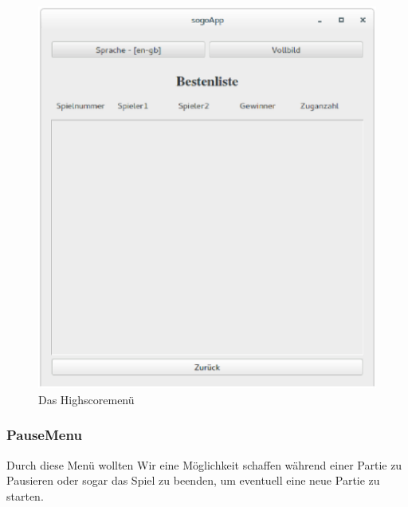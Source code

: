 \documentclass[a4paper]{scrartcl}
\begin{document}
\begin{figure}[H]
 	\centering
 	\includegraphics[scale=0.35]{graphics/highscore.eps}
 	\caption{Das Highscoremenü}
 	\label{fig:Highscoremenü}
\end{figure}

\subsubsection{PauseMenu}\label{ch:PauseMenu}
Durch diese Menü wollten Wir eine Möglichkeit schaffen während einer Partie zu Pausieren oder sogar das Spiel zu beenden, um eventuell eine neue Partie zu starten.
\end{document}

